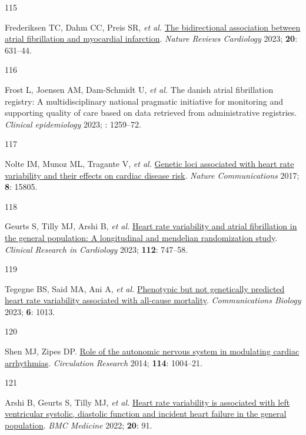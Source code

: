 \documentclass[
  a4paper,
  headsepline=true,
  open=left]{scrbook}
\newlength{\cslhangindent}
\newlength{\csllabelwidth}
\newlength{\cslentryspacingunit} %
\newenvironment{CSLReferences}[2] %
 {%
  \setlength{\parindent}{0pt}
  \ifodd #1
  \let\oldpar\par
  \def\par{\hangindent=\cslhangindent\oldpar}
  \fi
  \setlength{\parskip}{#2\cslentryspacingunit}
 }%
 {}
\newcommand{\CSLLeftMargin}[1]{\parbox[t]{\csllabelwidth}{#1}}
\newcommand{\CSLRightInline}[1]{\parbox[t]{\linewidth - \csllabelwidth}{#1}\break}
\begin{document}
\begin{CSLReferences}{0}{0}
\leavevmode{}%
\CSLLeftMargin{115 }%
\CSLRightInline{Frederiksen TC, Dahm CC, Preis SR, \emph{et al.}
\href{https://doi.org/10.1038/s41569-023-00857-3}{The bidirectional
association between atrial fibrillation and myocardial infarction}.
\emph{Nature Reviews Cardiology} 2023; \textbf{20}: 631--44.}

\leavevmode{}%
\CSLLeftMargin{116 }%
\CSLRightInline{Frost L, Joensen AM, Dam-Schmidt U, \emph{et al.} The
danish atrial fibrillation registry: A multidisciplinary national
pragmatic initiative for monitoring and supporting quality of care based
on data retrieved from administrative registries. \emph{Clinical
epidemiology} 2023; : 1259--72.}

\leavevmode{}%
\CSLLeftMargin{117 }%
\CSLRightInline{Nolte IM, Munoz ML, Tragante V, \emph{et al.}
\href{https://doi.org/10.1038/ncomms15805}{Genetic loci associated with
heart rate variability and their effects on cardiac disease risk}.
\emph{Nature Communications} 2017; \textbf{8}: 15805.}

\leavevmode{}%
\CSLLeftMargin{118 }%
\CSLRightInline{Geurts S, Tilly MJ, Arshi B, \emph{et al.}
\href{https://doi.org/10.1007/s00392-022-02072-5}{Heart rate variability
and atrial fibrillation in the general population: A longitudinal and
mendelian randomization study}. \emph{Clinical Research in Cardiology}
2023; \textbf{112}: 747--58.}

\leavevmode{}%
\CSLLeftMargin{119 }%
\CSLRightInline{Tegegne BS, Said MA, Ani A, \emph{et al.}
\href{https://doi.org/10.1038/s42003-023-05376-y}{Phenotypic but not
genetically predicted heart rate variability associated with all-cause
mortality}. \emph{Communications Biology} 2023; \textbf{6}: 1013.}

\leavevmode{}%
\CSLLeftMargin{120 }%
\CSLRightInline{Shen MJ, Zipes DP.
\href{https://doi.org/10.1161/CIRCRESAHA.113.302549}{Role of the
autonomic nervous system in modulating cardiac arrhythmias}.
\emph{Circulation Research} 2014; \textbf{114}: 1004--21.}

\leavevmode{}%
\CSLLeftMargin{121 }%
\CSLRightInline{Arshi B, Geurts S, Tilly MJ, \emph{et al.}
\href{https://doi.org/10.1186/s12916-022-02273-9}{Heart rate variability
is associated with left ventricular systolic, diastolic function and
incident heart failure in the general population}. \emph{BMC Medicine}
2022; \textbf{20}: 91.}


\end{CSLReferences}
\end{document}
